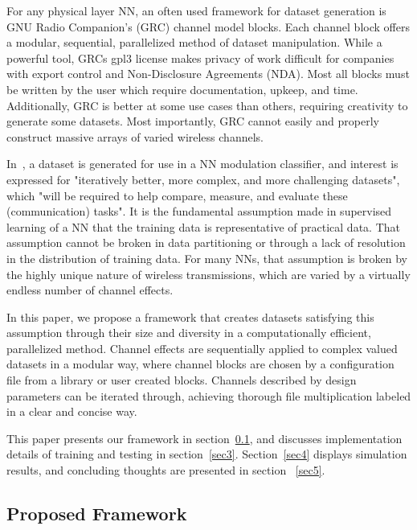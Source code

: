 For any physical layer NN, an often used framework for dataset generation is GNU Radio Companion's (GRC) channel model blocks. Each channel block offers a modular, sequential, parallelized method of dataset manipulation. While a powerful tool, GRCs gpl3 license makes privacy of work difficult for companies with export control and Non-Disclosure Agreements (NDA). Most all blocks must be written by the user which require documentation, upkeep, and time. Additionally, GRC is better at some use cases than others, requiring creativity to generate some datasets. Most importantly, GRC cannot easily and properly construct massive arrays of varied wireless channels.

In~\cite{o2016radio}, a dataset is generated for use in a NN modulation classifier, and interest is expressed for "iteratively better, more complex, and more challenging datasets", which "will be required to help compare, measure, and evaluate these (communication) tasks". It is the fundamental assumption made in supervised learning of a NN that the training data is representative of practical data. That assumption cannot be broken in data partitioning or through a lack of resolution in the distribution of training data. For many NNs, that assumption is broken by the highly unique nature of wireless transmissions, which are varied by a virtually endless number of channel effects.

In this paper, we propose a framework that creates datasets satisfying this assumption through their size and diversity in a computationally efficient, parallelized method. Channel effects are sequentially applied to complex valued datasets in a modular way, where channel blocks are chosen by a configuration file from a library or user created blocks. Channels described by design parameters can be iterated through, achieving thorough file multiplication labeled in a clear and concise way.

This paper presents our framework in section~\ref{sec2}, and discusses implementation details of training and testing in section~\ref{sec3}. Section~\ref{sec4} displays simulation results, and concluding thoughts are presented in section ~\ref{sec5}.

\subsection{Proposed Framework}
\label{sec2}

